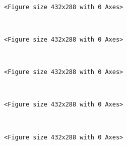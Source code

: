 \documentclass[11pt]{article}
\begin{document}
    \begin{center}
    \end{center}
    { \hspace*{\fill} \\}
    
    
    \begin{verbatim}
<Figure size 432x288 with 0 Axes>
    \end{verbatim}

    
    \begin{center}
    \end{center}
    { \hspace*{\fill} \\}
    
    
    \begin{verbatim}
<Figure size 432x288 with 0 Axes>
    \end{verbatim}

    
    \begin{center}
    \end{center}
    { \hspace*{\fill} \\}
    
    
    \begin{verbatim}
<Figure size 432x288 with 0 Axes>
    \end{verbatim}

    
    \begin{center}
    \end{center}
    { \hspace*{\fill} \\}
    
    
    \begin{verbatim}
<Figure size 432x288 with 0 Axes>
    \end{verbatim}

    
    \begin{center}
    \end{center}
    { \hspace*{\fill} \\}
    
    
    \begin{verbatim}
<Figure size 432x288 with 0 Axes>
    \end{verbatim}
\end{document}
